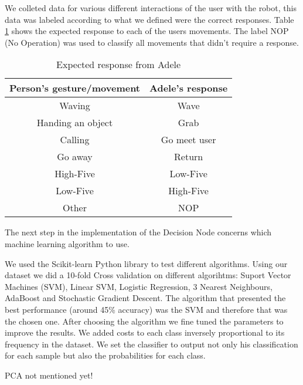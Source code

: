 We colleted data for various different interactions of the user with the robot, this data was labeled according to what we defined were the correct responses. Table \ref{tab:expected_response} shows the expected response to each of the users movements. The label NOP (No Operation) was used to classify all movements that didn't require a response.

\begin{table}[!h]
\centering
\caption{Expected response from Adele}
\label{tab:expected_response}
\begin{tabular}{|c|c|}
\hline
\textbf{Person's gesture/movement} & \textbf{Adele's response} \\ \hline
Waving                           & Wave                                 \\
Handing an object                & Grab                            		\\
Calling                          & Go meet user                         \\
Go away                          & Return                       \\
High-Five                        & Low-Five                             \\
Low-Five                         & High-Five                            \\
Other	                           & NOP                                  \\ \hline
\end{tabular}
\end{table}

The next step in the implementation of the Decision Node concerns which machine learning algorithm to use.

We used the Scikit-learn Python library \cite{Scikit-Learn} to test different algorithms. Using our dataset we did a 10-fold Cross validation on different algorihtms: Suport Vector Machines (SVM), Linear SVM, Logistic Regression, 3 Nearest Neighbours, AdaBoost and Stochastic Gradient Descent. The algorithm that presented the best performance (around 45\% accuracy) was the SVM and therefore that was the chosen one. After choosing the algorithm we fine tuned the parameters to improve the results. We added costs to each class inversely proportional to its frequency in the dataset. We set the classifier to output not only his classification for each sample but also the probabilities for each class.

\color{red} PCA not mentioned yet! \color{black}

